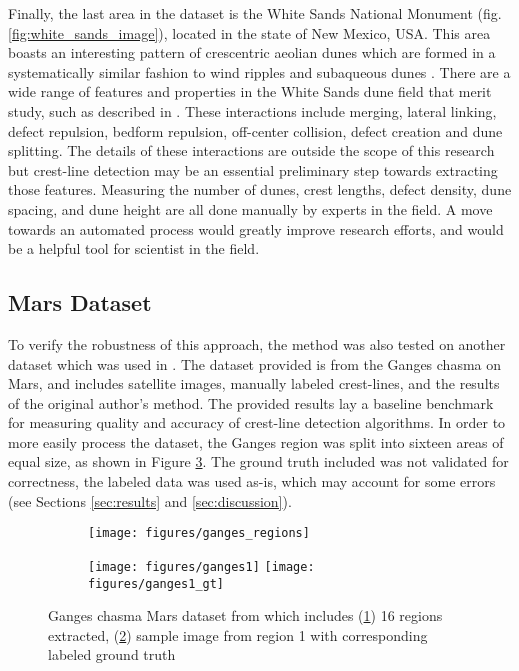 \documentclass[review]{elsarticle}
\begin{document}
Finally, the last area in the dataset is the White Sands National Monument (fig. \ref{fig:white_sands_image}), located in the state of New Mexico, USA. This area boasts an interesting pattern of crescentric aeolian dunes which are formed in a systematically similar fashion to wind ripples and subaqueous dunes \cite{ewing_aeolian_dune_interaction_white_sands}. There are a wide range of features and properties in the White Sands dune field that merit study, such as described in \cite{ewing_aeolian_dune_interaction_white_sands}. These interactions include merging, lateral linking, defect repulsion, bedform repulsion, off-center collision, defect creation and dune splitting. The details of these interactions are outside the scope of this research but crest-line detection may be an essential preliminary step towards extracting those features. Measuring the number of dunes, crest lengths, defect density, dune spacing, and dune height are all done manually by experts in the field. A move towards an automated process would greatly improve research efforts, and would be a helpful tool for scientist in the field.

\subsection{Mars Dataset}
\label{subsec:mars_dataset}
To verify the robustness of this approach, the method was also tested on another dataset which was used in \cite{vaz_object_based_dune_analysis}. The dataset provided is from the Ganges chasma on Mars, and includes satellite images, manually labeled crest-lines, and the results of the original author's method. The provided results lay a baseline benchmark for measuring quality and accuracy of crest-line detection algorithms. In order to more easily process the dataset, the Ganges region was split into sixteen areas of equal size, as shown in Figure \ref{fig:mars_ganges_dataset}. The ground truth included was not validated for correctness, the labeled data was used as-is, which may account for some errors (see Sections \ref{sec:results} and \ref{sec:discussion}).

\begin{figure}
	\centering
	\begin{subfigure}{\textwidth}
		\centering
		\texttt{[image: figures/ganges\_regions]}
		\caption{}
		\label{fig:ganges_regions}
	\end{subfigure}
	\begin{subfigure}{\textwidth}
		\centering
		\texttt{[image: figures/ganges1]}
		\texttt{[image: figures/ganges1\_gt]}
		\caption{}
		\label{fig:ganges1_image}
	\end{subfigure}
	
	\caption{Ganges chasma Mars dataset from \cite{vaz_object_based_dune_analysis} which includes (\ref{fig:ganges_regions}) 16 regions extracted, (\ref{fig:ganges1_image}) sample image from region 1 with corresponding labeled ground truth}
	\label{fig:mars_ganges_dataset}
\end{figure}
\end{document}
